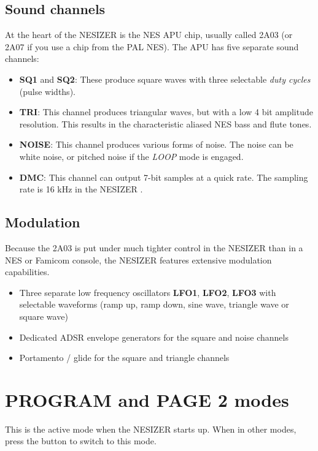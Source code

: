 \documentclass[a4paper, 12p, titlepaget]{book}
\newcommand \name {NESIZER }
\newcommand {\btn}[1] {\framebox{\textbf{\footnotesize #1}}}
\newcommand {\lbl}[1] {\emph{\footnotesize #1}}
\begin{document}
\subsection{Sound channels}

At the heart of the \name is the NES APU chip, usually called 2A03 (or 2A07 if you use a chip from the PAL NES). The APU has five separate sound channels:

\begin{itemize}
\item \textbf{SQ1} and \textbf{SQ2}: These produce square waves with three selectable \emph{duty cycles} (pulse widths).
\item \textbf{TRI}: This channel produces triangular waves, but with a low 4 bit amplitude resolution. This results in the characteristic aliased NES bass and flute tones.
\item \textbf{NOISE}: This channel produces various forms of noise. The noise can be white noise, or pitched noise if the \lbl{LOOP} mode is engaged.
\item \textbf{DMC}: This channel can output 7-bit samples at a quick rate. The sampling rate is 16 kHz in the \name.
\end{itemize}

\subsection{Modulation}

Because the 2A03 is put under much tighter control in the \name than in a NES or Famicom console, the \name features extensive modulation capabilities.

\begin{itemize}
\item Three separate low frequency oscillators \textbf{LFO1}, \textbf{LFO2}, \textbf{LFO3} with selectable waveforms (ramp up, ramp down, sine wave, triangle wave or square wave)
\item Dedicated ADSR envelope generators for the square and noise channels
\item Portamento / glide for the square and triangle channels
\end{itemize}

\section{PROGRAM and PAGE 2 modes}

This is the active mode when the \name starts up. When in other modes, press the \btn{PROGRAM} button to switch to this mode.
\end{document}
